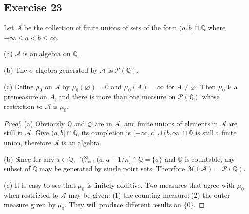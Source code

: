 \subsection*{Exercise 23}
Let $\mathcal{A}$ be the collection of finite unions of sets of the form $(a,b]\cap\mathbb{Q}$ where $-\infty\le a<b\le\infty$.
\par(a) $\mathcal{A}$ is an algebra on $\mathbb{Q}$.
\par(b) The $\sigma$-algebra generated by $\mathcal{A}$ is $\mathcal{P}(\mathbb{Q})$.
\par(c) Define $\mu_0$ on $\mathcal{A}$ by $\mu_0(\varnothing)=0$ and $\mu_0(A)=\infty$ for $A\neq\varnothing$. Then $\mu_0$ is a premeasure on $A$, and there is more than one measure on $\mathcal{P}(\mathbb{Q})$ whose restriction to $\mathcal{A}$ is $\mu_0$.
\begin{proof}
    (a) Obviously $\mathbb{Q}$ and $\varnothing$ are in $\mathcal{A}$, and finite unions of elements in $\mathcal{A}$ are still in $\mathcal{A}$. Give $(a,b]\cap\mathbb{Q}$, its completion is $(-\infty,a]\cup(b,\infty]\cap\mathbb{Q}$ is still a finite union, therefore $\mathcal{A}$ is an algebra.
    \par (b) Since for any $a\in\mathbb{Q}$, $\cap_{n=1}^{\infty}(a,a+1/n]\cap\mathbb{Q}=\{a\}$ and $\mathbb{Q}$ is countable, any subset of $\mathbb{Q}$ may be generated by single point sets. Therefore $\mathcal{M}(\mathcal{A})=\mathcal{P}(\mathbb{Q})$.
    \par (c) It is easy to see that $\mu_0$ is finitely additive. Two measures that agree with $\mu_0$ when restricted to $\mathcal{A}$ may be given: (1) the counting measure; (2) the outer measure given by $\mu_0$. They will produce different results on $\{0\}$.
\end{proof}
